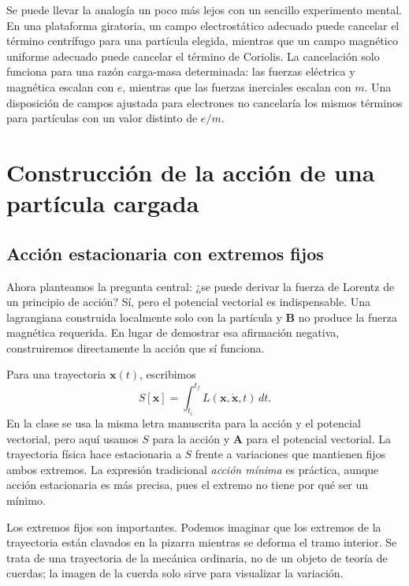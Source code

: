 Se puede llevar la analogía un poco más lejos con un sencillo experimento mental. En una plataforma giratoria, un campo electrostático adecuado puede cancelar el término centrífugo para una partícula elegida, mientras que un campo magnético uniforme adecuado puede cancelar el término de Coriolis. La cancelación solo funciona para una razón carga-masa determinada: las fuerzas eléctrica y magnética escalan con \(e\), mientras que las fuerzas inerciales escalan con \(m\). Una disposición de campos ajustada para electrones no cancelaría los mismos términos para partículas con un valor distinto de \(e/m\).

\section{Construcción de la acción de una partícula cargada}

\subsection{Acción estacionaria con extremos fijos}

Ahora planteamos la pregunta central: ¿se puede derivar la fuerza de Lorentz de un principio de acción? Sí, pero el potencial vectorial es indispensable. Una lagrangiana construida localmente solo con la partícula y \(\mathbf B\) no produce la fuerza magnética requerida. En lugar de demostrar esa afirmación negativa, construiremos directamente la acción que sí funciona.

Para una trayectoria \(\mathbf x(t)\), escribimos
\begin{equation}
  S[\mathbf x]
  =
  \int_{t_i}^{t_f}L(\mathbf x,\dot{\mathbf x},t)\,dt.
\end{equation}
En la clase se usa la misma letra manuscrita para la acción y el potencial vectorial, pero aquí usamos \(S\) para la acción y \(\mathbf A\) para el potencial vectorial. La trayectoria física hace estacionaria a \(S\) frente a variaciones que mantienen fijos ambos extremos. La expresión tradicional \emph{acción mínima} es práctica, aunque acción estacionaria es más precisa, pues el extremo no tiene por qué ser un mínimo.

Los extremos fijos son importantes. Podemos imaginar que los extremos de la trayectoria están clavados en la pizarra mientras se deforma el tramo interior. Se trata de una trayectoria de la mecánica ordinaria, no de un objeto de teoría de cuerdas; la imagen de la cuerda solo sirve para visualizar la variación.

